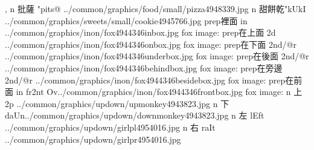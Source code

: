 \begin{tGe}{14}{, }
         {n} {批薩}  {}{"pits@}              {../common/graphics/food/small/pizza4948339.jpg}        {}
        {n} {甜餅乾}{}{"kUkI}       {../common/graphics/sweets/small/cookie4945766.jpg}        {}
            {prep}{裡面}    {}{in}         {../common/graphics/inon/fox4944346inbox.jpg}     {fox image: }%
            {prep}{在上面}  {}{2d}         {../common/graphics/inon/fox4944346onbox.jpg}     {fox image: }%
         {prep}{在下面}  {}{2nd{/@r}}   {../common/graphics/inon/fox4944346underbox.jpg}  {fox image: }%
        {prep}{在後面}  {}{2nd{/@r}}   {../common/graphics/inon/fox4944346behindbox.jpg} {fox image: }%
        {prep}{在旁邊}  {}{2nd{/@r}}   {../common/graphics/inon/fox4944346besidebox.jpg} {fox image: }%
   {prep}{在前面}  {}{in fr2nt Ov}{../common/graphics/inon/fox4944346frontbox.jpg}  {fox image: }%
%
              {n} {上}      {}{2p}      {../common/graphics/updown/upmonkey4943823.jpg}    {}
            {n} {下}      {}{daUn}{../common/graphics/updown/downmonkey4943823.jpg}  {}
            {n} {左}      {}{lEft}    {../common/graphics/updown/girlpl4954016.jpg}      {}
           {n} {右}      {}{raIt}    {../common/graphics/updown/girlpr4954016.jpg}      {}

\end{tGe}
